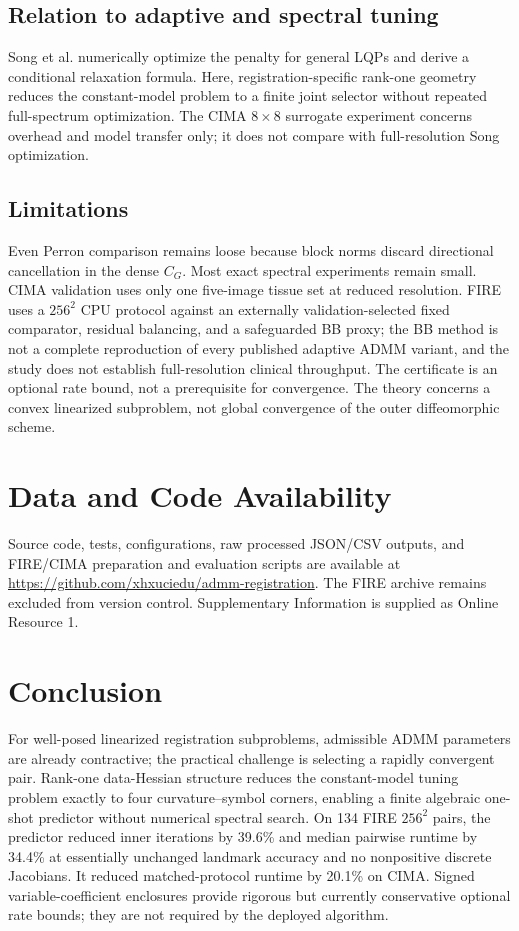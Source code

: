 \documentclass[pdflatex,iicol,sn-mathphys-num]{sn-jnl}
\theoremstyle{definition}\newtheorem{definition}[theorem]{Definition}\newtheorem{remark}[theorem]{Remark}
\begin{document}
\subsection{Relation to adaptive and spectral tuning}
Song et al. numerically optimize the penalty for general LQPs and derive a
conditional relaxation formula. Here, registration-specific rank-one geometry
reduces the constant-model problem to a finite joint selector without repeated
full-spectrum optimization. The CIMA $8\times8$ surrogate experiment concerns
overhead and model transfer only; it does not compare with full-resolution Song
optimization.

\subsection{Limitations}
Even Perron comparison remains loose because block norms discard directional cancellation in the dense $C_G$. Most exact spectral experiments remain small. CIMA validation uses only one five-image tissue set at reduced resolution. FIRE uses a $256^2$ CPU protocol against an externally validation-selected fixed comparator, residual balancing, and a safeguarded BB proxy; the BB method is not a complete reproduction of every published adaptive ADMM variant, and the study does not establish full-resolution clinical throughput. The certificate is an optional rate bound, not a prerequisite for convergence. The theory concerns a convex linearized subproblem, not global convergence of the outer diffeomorphic scheme.

\section{Data and Code Availability}
Source code, tests, configurations, raw processed JSON/CSV outputs, and
FIRE/CIMA preparation and evaluation scripts are available at
\url{https://github.com/xhxuciedu/admm-registration}. The FIRE archive remains
excluded from version control. Supplementary Information is supplied as Online
Resource 1.

\section{Conclusion}
For well-posed linearized registration subproblems, admissible ADMM parameters
are already contractive; the practical challenge is selecting a rapidly
convergent pair. Rank-one data-Hessian structure reduces the constant-model
tuning problem exactly to four curvature--symbol corners, enabling a finite
algebraic one-shot predictor without numerical spectral search. On 134 FIRE
$256^2$ pairs, the predictor reduced inner iterations by 39.6\% and median
pairwise runtime by 34.4\% at essentially unchanged landmark accuracy and no
nonpositive discrete Jacobians. It reduced matched-protocol runtime by 20.1\%
on CIMA. Signed variable-coefficient enclosures provide rigorous but currently
conservative optional rate bounds; they are not required by the deployed
algorithm.
\end{document}

